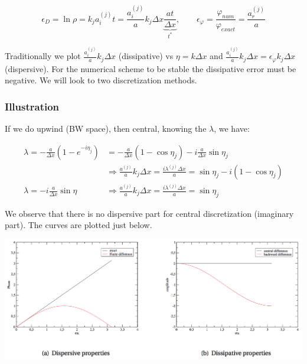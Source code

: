 \begin{equation}
\epsilon _D = \ln \rho = k_j a_i^{(j)} t = \frac{a_i^{(j)}}{a} k_j \Delta x \underbrace{\frac{at}{\Delta x}}_{t^*}, \qquad \epsilon _\varphi = \frac{\varphi _{num}}{\varphi _{exact}} = \frac{a_r^{(j)}}{a}
\end{equation}

Traditionally we plot $\frac{a _i ^(j)}{a} k_j \Delta x$ (dissipative) vs $\eta= k \Delta x$ and $\frac{a_i^{(j)}}{a}k_j \Delta x= \epsilon _\varphi k_j \Delta x$ (dispersive). For the numerical scheme to be stable the dissipative error must be negative. We will look to two discretization methods. 

\subsubsection{Illustration}
If we do upwind (BW space), then central, knowing the $\lambda$, we have: 

\begin{equation}
\begin{aligned}
\lambda = -\frac{a}{\Delta x} (1 - e^{-i\eta _j}) &= -\frac{a}{\Delta x} (1 - \cos \eta_j) - i \frac{a}{\Delta x} \sin \eta_j\\
&\Rightarrow \frac{a^{(j)}}{a}k_j \Delta x = \frac{i \lambda ^{(j)} \Delta x}{a} = \sin \eta _j - i(1 - \cos \eta _j) \\
\lambda = -i \frac{a}{\Delta x} \sin \eta \qquad &\Rightarrow \frac{a^{(j)}}{a}k_j \Delta x = \frac{i \lambda ^{(j)} \Delta x}{a} = \sin \eta _j
\end{aligned}
\end{equation}

We observe that there is no dispersive part for central discretization (imaginary part). The curves are plotted just below.

\begin{center}
\includegraphics[scale=0.5]{ch3/9}
\end{center}

